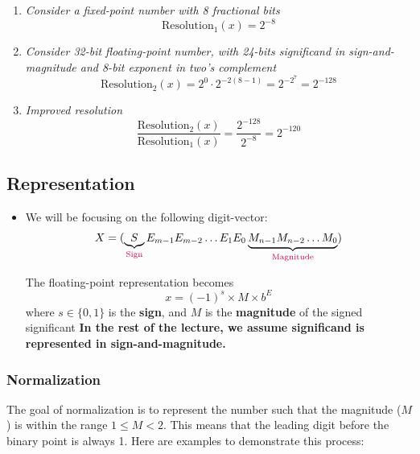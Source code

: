 \documentclass[12pt,openany, tikz,border=10pt]{book}
\begin{document}
\begin{enumerate}

        \item \textit{Consider a fixed-point number with 8 fractional bits}
        \begin{equation*}
            \text{Resolution}_1(x) = 2^{-8}
        \end{equation*}
    
        \item \textit{Consider 32-bit floating-point number, with 24-bits significand in sign-and-magnitude and 8-bit exponent in two's complement}
        \begin{equation*}
            \text{Resolution}_2(x) = 2^0 \cdot 2^{-2(8-1)} = 2^{-2^7} = 2^{-128}
        \end{equation*}
    
        \item \textit{Improved resolution}
        \begin{equation*}
            \frac{\text{Resolution}_2(x)}{\text{Resolution}_1(x)} = \frac{2^{-128}}{2^{-8}} = 2^{-120}
        \end{equation*}
    \end{enumerate}


    
    \subsection{Representation}
    \begin{itemize}
        \item[] We will be focusing on the following digit-vector:
        \[
        X = (\underbrace{S}_{\text{\color{purple}Sign}}E_{m-1}E_{m-2}\dots E_1E_0\underbrace{M_{n-1}M_{n-2}\dots M_0}_{\text{\color{purple}Magnitude}})
        \]


    The floating-point representation becomes
    \[
    x = (-1)^s \times M \times b^E
    \]
    where \( s \in \{0, 1\} \) is the \textbf{sign}, and \( M \) is the \textbf{magnitude} of the signed significant
    \vskip 0.5cm
    \textbf{In the rest of the lecture, we assume significand is represented in sign-and-magnitude.}
    \end{itemize}


    \subsubsection[short]{Normalization}
    The goal of normalization is to represent the number such that the magnitude (\(M\)) is within the range \(1 \leq M < 2\). This means that the leading digit before the binary point is always 1. Here are examples to demonstrate this process:
\end{document}
